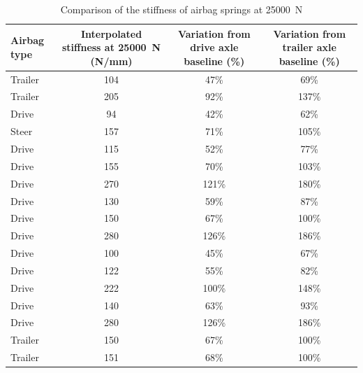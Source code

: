 \begin{table}[H]
	\centering\footnotesize
	\begin{threeparttable}
    
    	\caption{Comparison of the stiffness of airbag springs at 25000~N}
		\label{table:comparison-of-dynamic-response-of-airbag-springs}

		\begin{tabulary}{\textwidth}{lCCC}
			\toprule
			\textbf{Airbag type} & \textbf{Interpolated stiffness at 25000~N (N/mm)} & \textbf{Variation from drive axle baseline (\%)} & \textbf{Variation from trailer axle baseline (\%)} \\
			\midrule
			Trailer & 104   & 47\%  & 69\% \\
			Trailer & 205   & 92\%  & 137\% \\
			Drive & 94    & 42\%  & 62\% \\
			Steer & 157   & 71\%  & 105\% \\
			Drive & 115   & 52\%  & 77\% \\
			Drive & 155   & 70\%  & 103\% \\
			Drive & 270   & 121\% & 180\% \\
			Drive & 130   & 59\%  & 87\% \\
			Drive & 150   & 67\%  & 100\% \\
			Drive & 280   & 126\% & 186\% \\
			Drive & 100   & 45\%  & 67\% \\
			Drive & 122   & 55\%  & 82\% \\
			Drive & 222   & 100\% & 148\% \\
			Drive & 140   & 63\%  & 93\% \\
			Drive & 280   & 126\% & 186\% \\
			Trailer & 150   & 67\%  & 100\% \\
			Trailer & 151   & 68\%  & 100\% \\
			\bottomrule
		\end{tabulary}


	\end{threeparttable}
\end{table}

